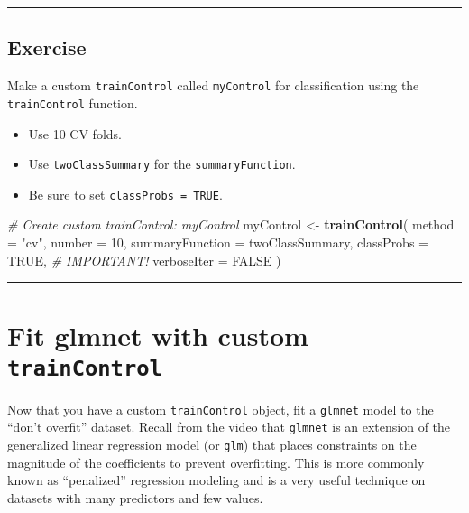 \documentclass[]{book}
\newenvironment{Shaded}{\begin{snugshade}}{\end{snugshade}}
\newcommand{\KeywordTok}[1]{\textcolor[rgb]{0.13,0.29,0.53}{\textbf{#1}}}
\newcommand{\DataTypeTok}[1]{\textcolor[rgb]{0.13,0.29,0.53}{#1}}
\newcommand{\DecValTok}[1]{\textcolor[rgb]{0.00,0.00,0.81}{#1}}
\newcommand{\StringTok}[1]{\textcolor[rgb]{0.31,0.60,0.02}{#1}}
\newcommand{\CommentTok}[1]{\textcolor[rgb]{0.56,0.35,0.01}{\textit{#1}}}
\newcommand{\OtherTok}[1]{\textcolor[rgb]{0.56,0.35,0.01}{#1}}
\newcommand{\NormalTok}[1]{#1}
\begin{document}
\begin{center}\rule{0.5\linewidth}{\linethickness}\end{center}

\subsection*{Exercise}\label{exercise-20}

Make a custom \texttt{trainControl} called \texttt{myControl} for
classification using the \texttt{trainControl} function.

\begin{itemize}
\item
  Use 10 CV folds.
\item
  Use \texttt{twoClassSummary} for the \texttt{summaryFunction}.
\item
  Be sure to set \texttt{classProbs\ =\ TRUE}.
\end{itemize}

\begin{Shaded}
\begin{Highlighting}[]
\CommentTok{# Create custom trainControl: myControl}
\NormalTok{myControl <-}\StringTok{ }\KeywordTok{trainControl}\NormalTok{(}
  \DataTypeTok{method =} \StringTok{"cv"}\NormalTok{, }
  \DataTypeTok{number =} \DecValTok{10}\NormalTok{,}
  \DataTypeTok{summaryFunction =}\NormalTok{ twoClassSummary,}
  \DataTypeTok{classProbs =} \OtherTok{TRUE}\NormalTok{, }\CommentTok{# IMPORTANT!}
  \DataTypeTok{verboseIter =} \OtherTok{FALSE}
\NormalTok{)}
\end{Highlighting}
\end{Shaded}

\begin{center}\rule{0.5\linewidth}{\linethickness}\end{center}

\section{\texorpdfstring{Fit glmnet with custom
\texttt{trainControl}}{Fit glmnet with custom trainControl}}\label{fit-glmnet-with-custom-traincontrol}

Now that you have a custom \texttt{trainControl} object, fit a
\texttt{glmnet} model to the ``don't overfit'' dataset. Recall from the
video that \texttt{glmnet} is an extension of the generalized linear
regression model (or \texttt{glm}) that places constraints on the
magnitude of the coefficients to prevent overfitting. This is more
commonly known as ``penalized'' regression modeling and is a very useful
technique on datasets with many predictors and few values.
\end{document}
